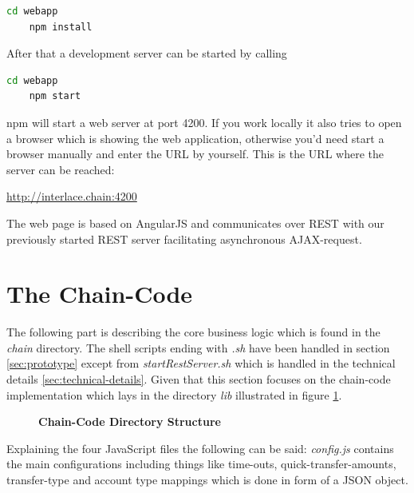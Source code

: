 \begin{lstlisting}[language=bash]
	cd webapp
	npm install
\end{lstlisting}

After that a development server can be started by calling

\begin{lstlisting}[language=bash]
	cd webapp
	npm start
\end{lstlisting}

npm will start a web server at port 4200. If you work locally it also tries to open a browser which is showing the web application, otherwise you'd need start a browser manually and enter the URL by yourself. This is the URL where the server can be reached:

\url{http://interlace.chain:4200}

The web page is based on AngularJS and communicates over REST with our previously started REST server facilitating asynchronous AJAX-request.

\section{The Chain-Code}
\label{sec:chain-code}

The following part is describing the core business logic which is found in the \textit{chain} directory. The shell scripts ending with \textit{.sh} have been handled in section \ref{sec:prototype} except from \textit{startRestServer.sh} which is handled in the technical details \ref{sec:technical-details}. Given that this section focuses on the chain-code implementation which lays in the directory \textit{lib} illustrated in figure \ref{fig:chain-structure}.

\begin{figure}[htbp]
\centering
\begin{minipage}{5cm}
\end{minipage}
\caption{\bf\small Chain-Code Directory Structure}
\label{fig:chain-structure}
\end{figure}


Explaining the four JavaScript files the following can be said: \textit{config.js} contains the main configurations including things like time-outs, quick-transfer-amounts, transfer-type and account type mappings which is done in form of a JSON object.


